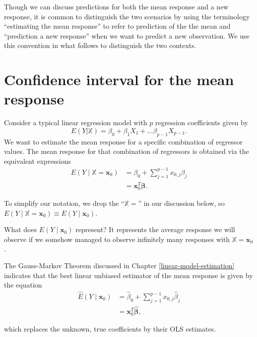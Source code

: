 \documentclass[
]{book}
\theoremstyle{definition}
\theoremstyle{definition}
\theoremstyle{definition}
\theoremstyle{definition}
\theoremstyle{remark}
\begin{document}
Though we can discuss predictions for both the mean response and a new response, it is common to distinguish the two scenarios by using the terminology ``estimating the mean response'' to refer to prediction of the the mean and ``prediction a new response'' when we want to predict a new observation. We use this convention in what follows to distinguish the two contexts.

\hypertarget{parametric-ci-mean-response}{%
\section{Confidence interval for the mean response}\label{parametric-ci-mean-response}}

Consider a typical linear regression model with \(p\) regression
coefficients given by
\[E(Y|\mathbb{X})=\beta_0+\beta_1 X_1 + \ldots \beta_{p-1} X_{p-1}.\]We
want to estimate the mean response for a specific combination of
regressor values. The mean response for that combination of regressors
is obtained via the equivalent expressions \[
\begin{aligned}
E(Y\mid \mathbb{X}=\mathbf{x}_0) &= \beta_0 + \sum_{j=1}^{p-1}x_{0,j}\beta_j \\
&= \mathbf{x}_0^T \boldsymbol{\beta}. 
\end{aligned}
\]

To simplify our notation, we drop the ``\(\mathbb{X}=\)'' in our discussion below, so
\(E(Y\mid \mathbb{X}=\mathbf{x}_0)\equiv E(Y\mid \mathbf{x}_0)\).

What does \(E(Y\mid \mathbf{x}_0)\) represent? It represents the average response we will observe if we somehow managed to observe infinitely many responses with \(\mathbb{X}=\mathbf{x}_0\).

The Gauss-Markov Theorem discussed in Chapter
\ref{linear-model-estimation} indicates that the best linear unbiased
estimator of the mean response is given by the equation\[
\begin{aligned}
\hat{E}(Y\mid \mathbf{x}_0) &= \hat{\beta}_0 + \sum_{j=1}^{p-1}x_{0,j}\hat{\beta}_j \\
&= \mathbf{x}_0^T \hat{\boldsymbol{\beta}}, 
\end{aligned}
\]

which replaces the unknown, true coefficients by their OLS estimates.
\end{document}
